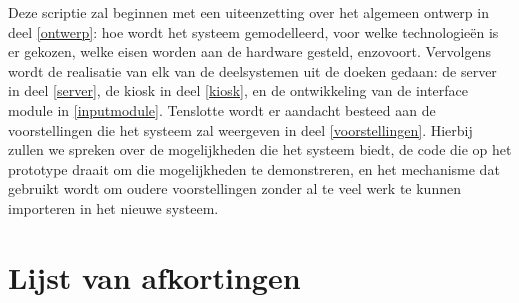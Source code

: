 Deze scriptie zal beginnen met een uiteenzetting over het algemeen ontwerp in deel \ref{ontwerp}: hoe wordt het systeem gemodelleerd, voor welke technologieën is er gekozen, welke eisen worden aan de hardware gesteld, enzovoort.
Vervolgens wordt de realisatie van elk van de deelsystemen uit de doeken gedaan: de server in deel \ref{server}, de kiosk in deel \ref{kiosk}, en de ontwikkeling van de interface module in \ref{inputmodule}.
Tenslotte wordt er aandacht besteed aan de voorstellingen die het systeem zal weergeven in deel \ref{voorstellingen}. Hierbij zullen we spreken over de mogelijkheden die het systeem biedt, de code die op het prototype draait om die mogelijkheden te demonstreren, en het mechanisme dat gebruikt wordt om oudere voorstellingen zonder al te veel werk te kunnen importeren in het nieuwe systeem.

\clearpage


%
%

\setlength\cftpartnumwidth{2em}
\tableofcontents

\clearpage


%
%

\chapter*{Lijst van afkortingen}

\acresetall
\clearpage


